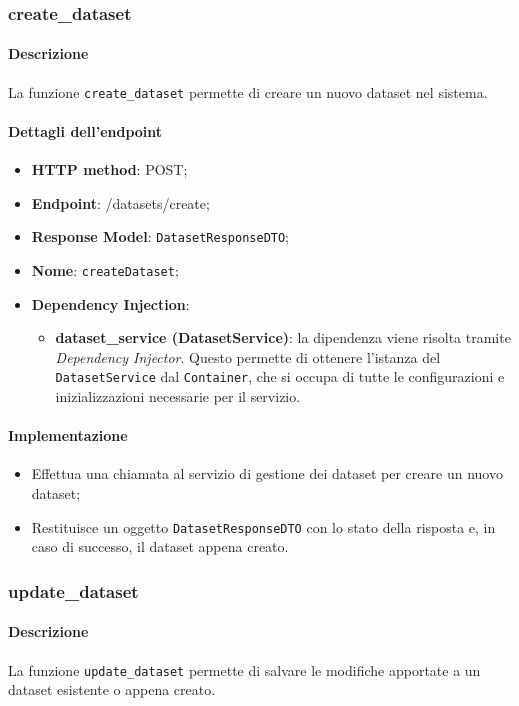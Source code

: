 \subsubsection{create\_dataset}
\paragraph{Descrizione}
La funzione \texttt{create\_dataset} permette di creare un nuovo dataset nel sistema.
\paragraph{Dettagli dell'endpoint}
\begin{itemize}
    \item \textbf{HTTP method}: POST;
    \item \textbf{Endpoint}: /datasets/create;
    \item \textbf{Response Model}: \texttt{DatasetResponseDTO};
    \item \textbf{Nome}: \texttt{createDataset};
    \item \textbf{Dependency Injection}: 
    \begin{itemize}
    \item \textbf{dataset\_service (DatasetService)}: la dipendenza viene risolta tramite \textit{Dependency Injector}. Questo permette di ottenere l'istanza del \texttt{DatasetService} dal \texttt{Container}, che si occupa di tutte le configurazioni e inizializzazioni necessarie per il servizio.
    \end{itemize}
\end{itemize}
\paragraph{Implementazione}
\begin{itemize}
    \item Effettua una chiamata al servizio di gestione dei dataset per creare un nuovo dataset;
    \item Restituisce un oggetto \texttt{DatasetResponseDTO} con lo stato della risposta e, in caso di successo, il dataset appena creato.
\end{itemize}

\subsubsection{update\_dataset}
\paragraph{Descrizione}
La funzione \texttt{update\_dataset} permette di salvare le modifiche apportate a un dataset esistente o appena creato.
